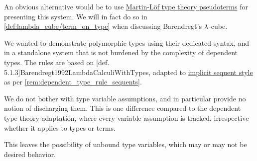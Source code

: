 \begin{comments}
  \item An obvious alternative would be to use \hyperref[def:mltt_pseudoterm]{Martin-L\"of type theory pseudoterms} for presenting this system. We will in fact do so in \cref{def:lambda_cube/term_on_type} when discussing Barendregt's \( {\mathrm \lambda} \)-cube.

  We wanted to demonstrate polymorphic types using their dedicated syntax, and in a standalone system that is not burdened by the complexity of dependent types. The rules are based on [def. 5.1.3]{Barendregt1992LambdaCalculiWithTypes}, adapted to \hyperref[rem:natural_deduction_explicit_sequents]{implicit sequent style} as per \cref{rem:dependent_type_rule_sequents}.

  \item We do not bother with type variable assumptions, and in particular provide no notion of discharging them. This is one difference compared to the dependent type theory adaptation, where every variable assumption is tracked, irrespective whether it applies to types or terms.

  This leaves the possibility of unbound type variables, which may or may not be desired behavior.
\end{comments}

